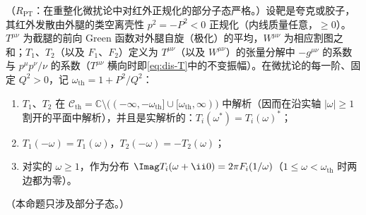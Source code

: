 \begin{proposition}\label{prop:dis-compton-analytic}
（$R_{\mathrm{PT}}$：在重整化微扰论中对红外正规化的部分子态严格。）设靶是夸克或胶子，其红外发散由外腿的类空离壳性 $p^2=-P^2<0$ 正规化（内线质量任意，$\ge0$）。$T^{\mu\nu}$ 为截腿的前向 Green 函数对外腿自旋（极化）的平均，$W^{\mu\nu}$ 为相应割图之和；$T_1$、$T_2$（以及 $F_1$、$F_2$）定义为 $T^{\mu\nu}$（以及 $W^{\mu\nu}$）的张量分解中 $-g^{\mu\nu}$ 的系数与 $p^\mu p^\nu/\nu$ 的系数（$T^{\mu\nu}$ 横向时即\cref{eq:dis-T}中的不变振幅）。在微扰论的每一阶、固定 $Q^2>0$，记 $\omega_{\mathrm{th}}=1+P^2/Q^2$：
\begin{enumerate}[label=(\alph*),leftmargin=2.2em,itemsep=0pt,topsep=2pt]
\item $T_1$、$T_2$ 在 $\mathcal C_{\mathrm{th}}=\mathbb C\setminus\big((-\infty,-\omega_{\mathrm{th}}]\cup[\omega_{\mathrm{th}},\infty)\big)$ 中解析（因而在沿实轴 $|\omega|\ge1$ 割开的平面中解析），并且是实解析的：$T_i(\omega^*)=T_i(\omega)^*$；
\item $T_1(-\omega)=T_1(\omega)$，$T_2(-\omega)=-T_2(\omega)$；
\item 对实的 $\omega\ge1$，作为分布 $\Imag T_i(\omega+\ii0)=2\pi F_i(1/\omega)$（$1\le\omega<\omega_{\mathrm{th}}$ 时两边都为零）。
\end{enumerate}
（本命题只涉及部分子态。）
\end{proposition}

